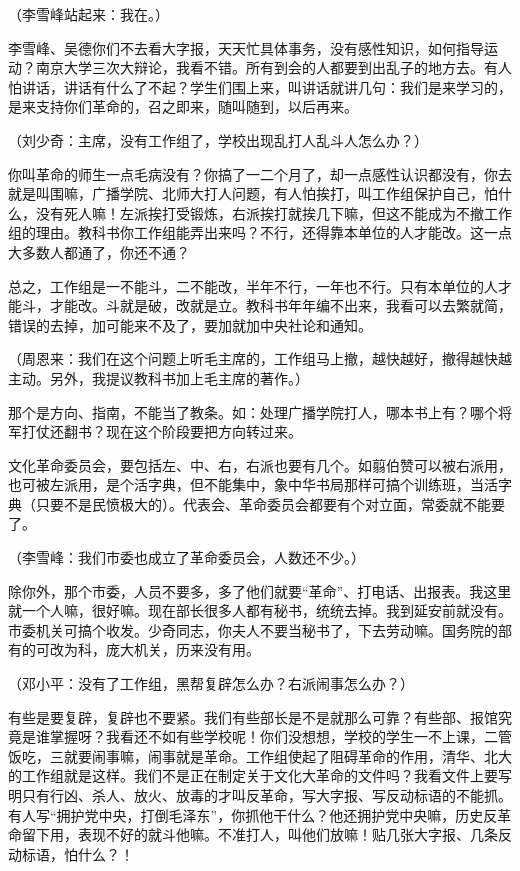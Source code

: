 （李雪峰站起来：我在。）

李雪峰、吴德你们不去看大字报，天天忙具体事务，没有感性知识，如何指导运动？南京大学三次大辩论，我看不错。所有到会的人都要到出乱子的地方去。有人怕讲话，讲话有什么了不起？学生们围上来，叫讲话就讲几句：我们是来学习的，是来支持你们革命的，召之即来，随叫随到，以后再来。

（刘少奇：主席，没有工作组了，学校出现乱打人乱斗人怎么办？）

你叫革命的师生一点毛病没有？你搞了一二个月了，却一点感性认识都没有，你去就是叫围嘛，广播学院、北师大打人问题，有人怕挨打，叫工作组保护自己，怕什么，没有死人嘛！左派挨打受锻炼，右派挨打就挨几下嘛，但这不能成为不撤工作组的理由。教科书你工作组能弄出来吗？不行，还得靠本单位的人才能改。这一点大多数人都通了，你还不通？

总之，工作组是一不能斗，二不能改，半年不行，一年也不行。只有本单位的人才能斗，才能改。斗就是破，改就是立。教科书年年编不出来，我看可以去繁就简，错误的去掉，加可能来不及了，要加就加中央社论和通知。

（周恩来：我们在这个问题上听毛主席的，工作组马上撤，越快越好，撤得越快越主动。另外，我提议教科书加上毛主席的著作。）

那个是方向、指南，不能当了教条。如：处理广播学院打人，哪本书上有？哪个将军打仗还翻书？现在这个阶段要把方向转过来。

文化革命委员会，要包括左、中、右，右派也要有几个。如翦伯赞可以被右派用，也可被左派用，是个活字典，但不能集中，象中华书局那样可搞个训练班，当活字典（只要不是民愤极大的）。代表会、革命委员会都要有个对立面，常委就不能要了。

（李雪峰：我们市委也成立了革命委员会，人数还不少。）

除你外，那个市委，人员不要多，多了他们就要“革命”、打电话、出报表。我这里就一个人嘛，很好嘛。现在部长很多人都有秘书，统统去掉。我到延安前就没有。市委机关可搞个收发。少奇同志，你夫人不要当秘书了，下去劳动嘛。国务院的部有的可改为科，庞大机关，历来没有用。

（邓小平：没有了工作组，黑帮复辟怎么办？右派闹事怎么办？）

有些是要复辟，复辟也不要紧。我们有些部长是不是就那么可靠？有些部、报馆究竟是谁掌握呀？我看还不如有些学校呢！你们没想想，学校的学生一不上课，二管饭吃，三就要闹事嘛，闹事就是革命。工作组使起了阻碍革命的作用，清华、北大的工作组就是这样。我们不是正在制定关于文化大革命的文件吗？我看文件上要写明只有行凶、杀人、放火、放毒的才叫反革命，写大字报、写反动标语的不能抓。有人写“拥护党中央，打倒毛泽东”，你抓他干什么？他还拥护党中央嘛，历史反革命留下用，表现不好的就斗他嘛。不准打人，叫他们放嘛！贴几张大字报、几条反动标语，怕什么？！

